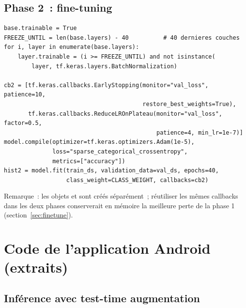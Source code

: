 \section{Phase 2~: fine-tuning}

\begin{lstlisting}[language=PythonK]
base.trainable = True
FREEZE_UNTIL = len(base.layers) - 40          # 40 dernieres couches
for i, layer in enumerate(base.layers):
    layer.trainable = (i >= FREEZE_UNTIL) and not isinstance(
        layer, tf.keras.layers.BatchNormalization)

cb2 = [tf.keras.callbacks.EarlyStopping(monitor="val_loss", patience=10,
                                        restore_best_weights=True),
       tf.keras.callbacks.ReduceLROnPlateau(monitor="val_loss", factor=0.5,
                                            patience=4, min_lr=1e-7)]
model.compile(optimizer=tf.keras.optimizers.Adam(1e-5),
              loss="sparse_categorical_crossentropy",
              metrics=["accuracy"])
hist2 = model.fit(train_ds, validation_data=val_ds, epochs=40,
                  class_weight=CLASS_WEIGHT, callbacks=cb2)
\end{lstlisting}

Remarque~: les objets  et  sont créés séparément~; réutiliser les mêmes callbacks dans les deux phases conserverait en mémoire la meilleure perte de la phase 1 (section~\ref{sec:finetune}).

\chapter{Code de l’application Android (extraits)}\label{app:kotlin}

\section{Inférence avec test-time augmentation}


